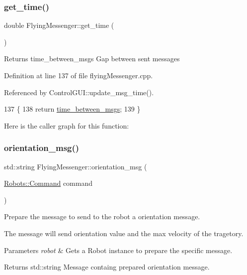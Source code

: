 \subsubsection{\texorpdfstring{get\+\_\+time()}{get\_time()}}
{\footnotesize\ttfamily double Flying\+Messenger\+::get\+\_\+time (\begin{DoxyParamCaption}{ }\end{DoxyParamCaption})}

\begin{DoxyReturn}{Returns}
time\+\_\+between\+\_\+msgs Gap between sent messages 
\end{DoxyReturn}


Definition at line 137 of file flying\+Messenger.\+cpp.



Referenced by Control\+G\+U\+I\+::update\+\_\+msg\+\_\+time().


\begin{DoxyCode}
137                                  \{
138     \textcolor{keywordflow}{return} \hyperlink{class_flying_messenger_a78023f5c0e3ee9242e0101d40f2a0d3c}{time\_between\_msgs};
139 \}
\end{DoxyCode}
Here is the caller graph for this function\+:
\mbox{\label{class_flying_messenger_a33d01541e04f6f2440c2828e49722ed4}} 
\subsubsection{\texorpdfstring{orientation\+\_\+msg()}{orientation\_msg()}}
{\footnotesize\ttfamily std\+::string Flying\+Messenger\+::orientation\+\_\+msg (\begin{DoxyParamCaption}\item[{\hyperlink{struct_robots_1_1_command}{Robots\+::\+Command}}]{command }\end{DoxyParamCaption})\hspace{0.3cm}{\ttfamily [private]}}



Prepare the message to send to the robot a orientation message. 

The message will send orientation value and the max velocity of the tragetory.


\begin{DoxyParams}{Parameters}
{\em robot} & Gets a Robot instance to prepare the specific message. \\
\hline
\end{DoxyParams}
\begin{DoxyReturn}{Returns}
std\+::string Message containg prepared orientation message. 
\end{DoxyReturn}


